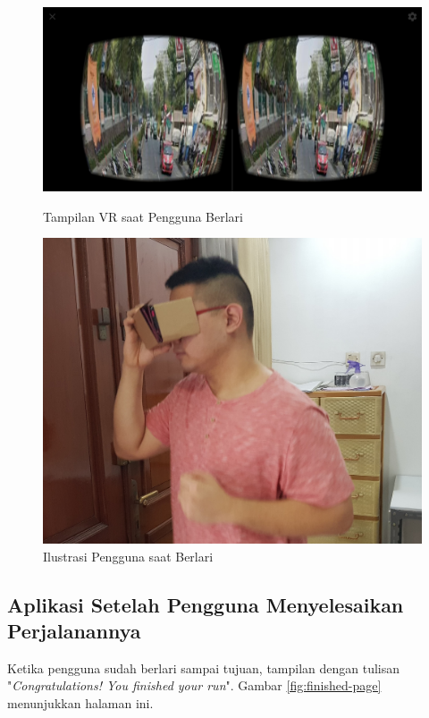 \begin{figure}
  \includegraphics[scale=0.1]{Gambar/vr-page.png}
    \caption{Tampilan VR saat Pengguna Berlari}
    \label{fig:vr-page}
\endminipage\hfill
{}
  \includegraphics[width=\linewidth]{Gambar/richard-running.jpg}
  \caption{Ilustrasi Pengguna saat Berlari}
  \label{fig:user-vr-page}
\endminipage\hfill
\end{figure}

\subsection{Aplikasi Setelah Pengguna Menyelesaikan Perjalanannya}
Ketika pengguna sudah berlari sampai tujuan, tampilan dengan tulisan "\textit{Congratulations! You finished your run}". Gambar \ref{fig:finished-page} menunjukkan halaman ini.

